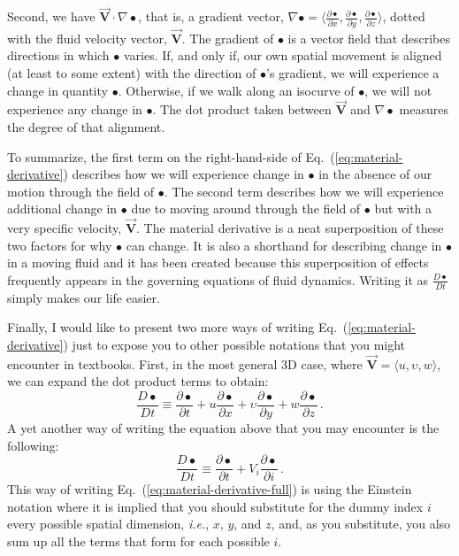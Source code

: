 Second, we have $\vec{\bm{V}} \cdot \nabla \bullet$, that is, a gradient vector, $\nabla \bullet = \langle \frac{\partial \bullet}{\partial x}, \frac{\partial \bullet}{\partial y}, \frac{\partial \bullet}{\partial z} \rangle$, dotted with the fluid velocity vector, $\vec{\bm{V}}$. 
The gradient of $\bullet$ is a vector field that describes directions in which $\bullet$ varies. If, and only if, our own spatial movement is aligned (at least to some extent) with the direction of $\bullet$'s gradient, we will experience a change in quantity $\bullet$. Otherwise, if we walk along an isocurve of $\bullet$, we will not experience any change in $\bullet$. The dot product taken between $\vec{\bm{V}}$ and $\nabla \bullet$ measures the degree of that alignment.

To summarize, the first term on the right-hand-side of Eq.~(\ref{eq:material-derivative}) describes how we will experience change in $\bullet$ in the absence of our motion through the field of $\bullet$. The second term describes how we will experience additional change in $\bullet$ due to moving around through the field of $\bullet$ but with a very specific velocity, $\vec{\bm{V}}$. The material derivative is a neat superposition of these two factors for why $\bullet$ can change. It is also a shorthand for describing change in $\bullet$ in a moving fluid and it has been created because this superposition of effects frequently appears in the governing equations of fluid dynamics. Writing it as $\frac{D \bullet}{D t}$ simply makes our life easier.



Finally, I would like to present two more ways of writing Eq.~(\ref{eq:material-derivative}) just to expose you to other possible notations that you might encounter in textbooks. 
First, in the most general 3D case, where $\vec{\bm{V}} = \langle u, \upsilon, w \rangle$, we can expand the dot product terms to obtain:
\begin{equation} \label{eq:material-derivative-full}
\frac{D \bullet}{D t} \equiv \frac{\partial \bullet}{\partial t} + u \frac{\partial \bullet}{\partial x} + \upsilon \frac{\partial \bullet}{\partial y} + w \frac{\partial \bullet}{\partial z} \, .
\end{equation}
A yet another way of writing the equation above that you may encounter is the following:
\begin{equation} \label{eq:material-derivative-ein stein}
\frac{D \bullet}{D t} \equiv \frac{\partial \bullet}{\partial t} + V_i \frac{\partial \bullet}{\partial i} \, .
\end{equation}
This way of writing Eq.~(\ref{eq:material-derivative-full}) is using the Einstein notation where it is implied that you should substitute for the dummy index $i$ every possible spatial dimension, \textit{i.e.}, $x$, $y$, and $z$, and, as you substitute, you also sum up all the terms that form for each possible $i$.

